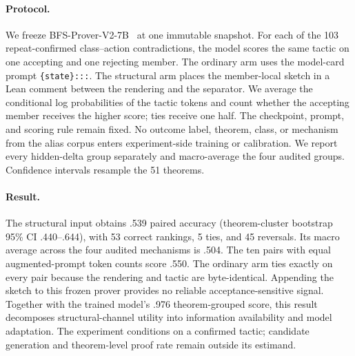 \documentclass[11pt]{article}
\begin{document}
\paragraph{Protocol.}
We freeze BFS-Prover-V2-7B~\cite{xin2025bfsproverv2} at one immutable snapshot.
For each of the 103 repeat-confirmed class--action contradictions, the model
scores the same tactic on one accepting and one rejecting member. The ordinary
arm uses the model-card prompt \texttt{\{state\}:::}. The structural arm places
the member-local sketch in a Lean comment between the rendering and the
separator. We average the conditional log probabilities of the tactic tokens
and count whether the accepting member receives the higher score; ties receive
one half. The checkpoint, prompt, and scoring rule remain fixed. No outcome
label, theorem, class, or mechanism from the alias corpus enters
experiment-side training or calibration. We report every hidden-delta group
separately and macro-average the four audited groups. Confidence intervals
resample the 51 theorems.

\begin{table}[t]\centering\small
\setlength{\tabcolsep}{3.0pt}
\caption{Frozen-prover paired ranking on 103 confirmed tactics. Each entry is
the fraction for which the accepting member scores above the rejecting member,
with ties assigned one half. The macro weights the four audited hidden-delta
groups equally.}
\label{tab:direct-model}
\end{table}

\paragraph{Result.}
The structural input obtains .539 paired accuracy (theorem-cluster bootstrap
95\% CI .440--.644), with 53 correct rankings, 5 ties, and 45 reversals. Its
macro average across the four audited mechanisms is .504. The ten pairs with
equal augmented-prompt token counts score .550. The ordinary arm ties exactly on every pair
because the rendering and tactic are byte-identical. Appending the sketch to
this frozen prover provides no reliable acceptance-sensitive signal. Together
with the trained model's .976 theorem-grouped score, this result decomposes
structural-channel utility into information availability and model adaptation. The
experiment conditions on a confirmed tactic; candidate generation and
theorem-level proof rate remain outside its estimand.
\end{document}
